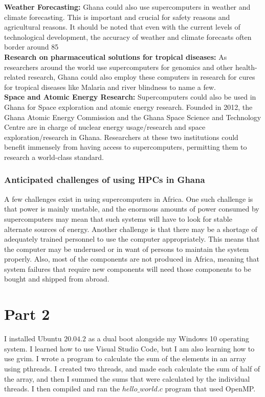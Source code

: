 \documentclass{article}
\begin{document}
\noindent\textbf{Weather Forecasting: }
Ghana could also use supercomputers in weather and climate forecasting. This is important and crucial for safety reasons and agricultural reasons. It should be noted that even with the current levels of technological development, the accuracy of weather and climate forecasts often border around 85%
\\

\noindent\textbf{Research on pharmaceutical solutions for tropical diseases: }
As researchers around the world use supercomputers for genomics and other health-related research, Ghana could also employ these computers in research for cures for tropical diseases like Malaria and river blindness to name a few. 
\\

\noindent\textbf{Space and Atomic Energy Research: }
Supercomputers could also be used in Ghana for Space exploration and atomic energy research. Founded in 2012, the Ghana Atomic Energy Commission and the Ghana Space Science and Technology Centre are in charge of nuclear energy usage/research and space exploration/research in Ghana. Researchers at these two institutions could benefit immensely from having access to supercomputers, permitting them to research a world-class standard. 
\\
\subsubsection{Anticipated challenges of using HPCs in Ghana}
A few challenges exist in using supercomputers in Africa. One such challenge is that power is mainly unstable, and the enormous amounts of power consumed by supercomputers may mean that such systems will have to look for stable alternate sources of energy. Another challenge is that there may be a shortage of adequately trained personnel to use the computer appropriately. This means that the computer may be underused or in want of persons to maintain the system properly. Also, most of the components are not produced in Africa, meaning that system failures that require new components will need those components to be bought and shipped from abroad. 
\newpage

 
\section{Part 2}
I installed Ubuntu $20.04.2$ as a dual boot alongside my Windows 10 operating system. I learned how to use Visual Studio Code, but I am also learning how to use gvim. I wrote a program to calculate the sum of the elements in an array using pthreads. I created two threads, and made each calculate the sum of half of the array, and then I summed the sums that were calculated by the individual threads. I then compiled and ran the $hello\_world.c$ program that used OpenMP. 
\end{document}
